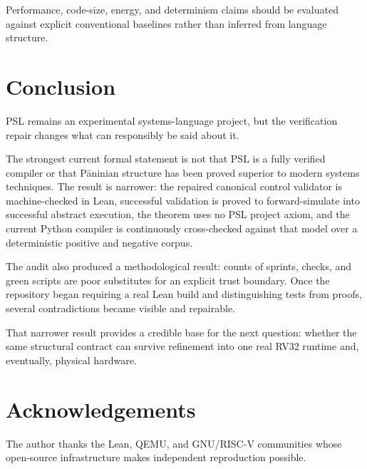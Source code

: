 \documentclass[11pt,a4paper]{article}
\begin{document}
Performance, code-size, energy, and determinism claims should be evaluated
against explicit conventional baselines rather than inferred from language
structure.

\section{Conclusion}

PSL remains an experimental systems-language project, but the verification
repair changes what can responsibly be said about it.

The strongest current formal statement is not that PSL is a fully verified
compiler or that P\={a}ninian structure has been proved superior to modern
systems techniques. The result is narrower: the repaired canonical control
validator is machine-checked in Lean, successful validation is proved to
forward-simulate into successful abstract execution, the theorem uses no PSL
project axiom, and the current Python compiler is continuously cross-checked
against that model over a deterministic positive and negative corpus.

The audit also produced a methodological result: counts of sprints, checks,
and green scripts are poor substitutes for an explicit trust boundary. Once
the repository began requiring a real Lean build and distinguishing tests from
proofs, several contradictions became visible and repairable.

That narrower result provides a credible base for the next question: whether
the same structural contract can survive refinement into one real RV32
runtime and, eventually, physical hardware.

\section*{Acknowledgements}

The author thanks the Lean, QEMU, and GNU/RISC-V communities whose open-source
infrastructure makes independent reproduction possible.



\end{document}

